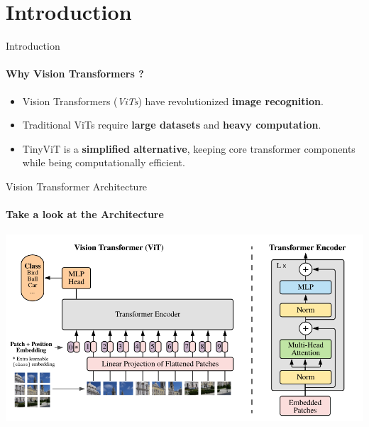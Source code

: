 \section{Introduction}

\begin{frame}{Introduction}
  \framesubtitle{Why Vision Transformers ?}
  \begin{itemize}
    \item Vision Transformers (\textit{ViTs}) have revolutionized \textbf{image recognition}.
    \item Traditional ViTs require \textbf{large datasets} and \textbf{heavy computation}.
    \item TinyViT is a \textbf{simplified alternative}, keeping core transformer components while being computationally efficient.
  \end{itemize}
\end{frame}

\begin{frame}{Vision Transformer Architecture}
  \framesubtitle{Take a look at the Architecture}
  \centering
  \includegraphics[width=\textwidth]{images/vit-architecture.png}
\end{frame}

